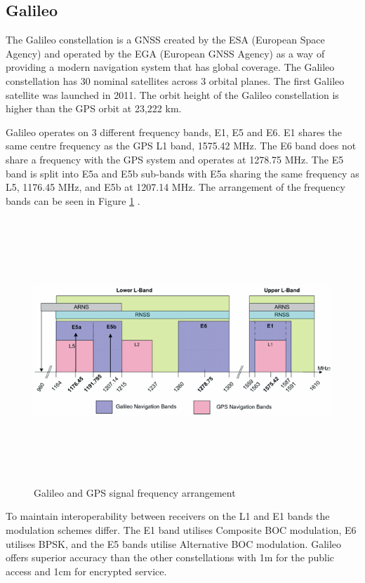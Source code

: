 \subsection{Galileo} \label{subsec:GNSS_GalileoIntro}
The Galileo constellation is a GNSS created by the ESA (European Space Agency) and operated by the EGA (European GNSS Agency) as a way of providing a modern navigation
system that has global coverage. The Galileo constellation has 30 nominal satellites across 3 orbital planes. The first Galileo satellite was launched in 2011.
The orbit height of the Galileo constellation is higher than the GPS orbit at 23,222 km. 

Galileo operates on 3 different frequency bands, E1, E5 and E6. E1 shares the same centre frequency as the GPS L1 band, 1575.42 MHz. The E6 band does not share a frequency
with the GPS system and operates at 1278.75 MHz. The E5 band is split into E5a and E5b sub-bands with E5a sharing the same frequency as L5, 1176.45 MHz, and E5b at
1207.14 MHz. The arrangement of the frequency bands can be seen in Figure \ref{fig:SignalPlan} \cite{RN69}.

\begin{figure}[h]
    \begin{centering}
        \includegraphics[width=14cm,height=10cm,keepaspectratio]{Figures/Galileo_Frequency_Plan.png}
        \caption{Galileo and GPS signal frequency arrangement \cite{RN69}}
        \label{fig:SignalPlan}
    \end{centering}
\end{figure}

To maintain interoperability between receivers on the L1 and E1 bands the modulation schemes differ.
The E1 band utilises Composite BOC modulation, E6 utilises BPSK, and the E5 bands utilise Alternative BOC modulation.
Galileo offers superior accuracy than the other constellations with 1m for the public access and 1cm for encrypted service.

